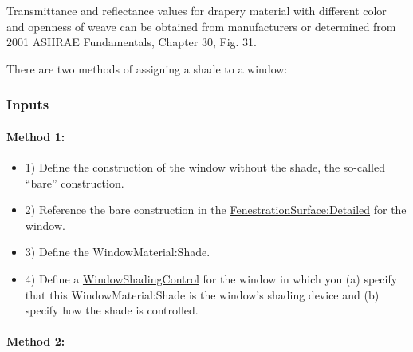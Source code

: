 Transmittance and reflectance values for drapery material with different color and openness of weave can be obtained from manufacturers or determined from 2001 ASHRAE Fundamentals, Chapter 30, Fig. 31.

There are two methods of assigning a shade to a window:

\subsubsection{Inputs}\label{inputs-22-005}

\paragraph{Method 1:}\label{method-1}

\begin{itemize}

\item 1) Define the construction of the window without the shade, the so-called ``bare'' construction.
	
\item 2) Reference the bare construction in the \hyperref[fenestrationsurfacedetailed]{FenestrationSurface:Detailed} for the window.

\item 3) Define the WindowMaterial:Shade.

\item 4) Define a \hyperref[windowpropertyshadingcontrol]{WindowShadingControl} for the window in which you (a) specify that this WindowMaterial:Shade is the window's shading device and (b) specify how the shade is controlled.

\end{itemize}

\paragraph{Method 2:}\label{method-2}

